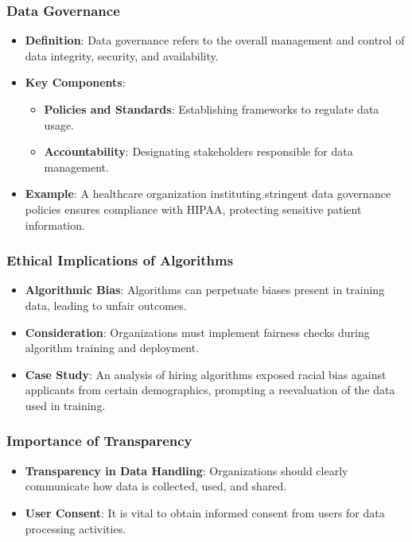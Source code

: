 \documentclass[aspectratio=169]{beamer}
\begin{document}
\begin{frame}[fragile]
    \frametitle{Data Governance}
    \begin{itemize}
        \item \textbf{Definition}: Data governance refers to the overall management and control of data integrity, security, and availability.
        \item \textbf{Key Components}:
        \begin{itemize}
            \item \textbf{Policies and Standards}: Establishing frameworks to regulate data usage.
            \item \textbf{Accountability}: Designating stakeholders responsible for data management.
        \end{itemize}
        \item \textbf{Example}: A healthcare organization instituting stringent data governance policies ensures compliance with HIPAA, protecting sensitive patient information.
    \end{itemize}
\end{frame}

\begin{frame}[fragile]
    \frametitle{Ethical Implications of Algorithms}
    \begin{itemize}
        \item \textbf{Algorithmic Bias}: Algorithms can perpetuate biases present in training data, leading to unfair outcomes.
        \item \textbf{Consideration}: Organizations must implement fairness checks during algorithm training and deployment.
        \item \textbf{Case Study}: An analysis of hiring algorithms exposed racial bias against applicants from certain demographics, prompting a reevaluation of the data used in training.
    \end{itemize}
\end{frame}

\begin{frame}[fragile]
    \frametitle{Importance of Transparency}
    \begin{itemize}
        \item \textbf{Transparency in Data Handling}: Organizations should clearly communicate how data is collected, used, and shared.
        \item \textbf{User Consent}: It is vital to obtain informed consent from users for data processing activities.
    \end{itemize}
\end{frame}
\end{document}
